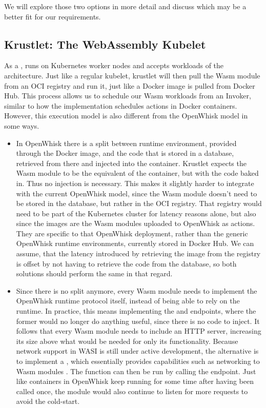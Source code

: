 We will explore those two options in more detail and discuss which may be a better fit for our requirements.

\subsection{Krustlet: The WebAssembly Kubelet}

As a ,  runs on Kubernetes worker nodes and accepts workloads of the  architecture. Just like a regular kubelet, krustlet will then pull the Wasm module from an OCI registry and run it, just like a Docker image is pulled from Docker Hub. This process allows us to schedule our Wasm workloads from an Invoker, similar to how the  implementation schedules actions in Docker containers. However, this execution model is also different from the OpenWhisk model in some ways.

\begin{itemize}
    \item In OpenWhisk there is a split between runtime environment, provided through the Docker image, and the code that is stored in a database, retrieved from there and injected into the container. Krustlet expects the Wasm module to be the equivalent of the container, but with the code baked in. Thus no injection is necessary. This makes it slightly harder to integrate with the current OpenWhisk model, since the Wasm module doesn't need to be stored in the database, but rather in the OCI registry. That registry would need to be part of the Kubernetes cluster for latency reasons alone, but also since the images are the Wasm modules uploaded to OpenWhisk as actions. They are specific to that OpenWhisk deployment, rather than the generic OpenWhisk runtime environments, currently stored in Docker Hub. We can assume, that the latency introduced by retrieving the image from the registry is offset by not having to retrieve the code from the database, so both solutions should perform the same in that regard.
    \item Since there is no split anymore, every Wasm module needs to implement the OpenWhisk runtime protocol itself, instead of being able to rely on the runtime. In practice, this means implementing the  and  endpoints, where the former would no longer do anything useful, since there is no code to inject. It follows that every Wasm module needs to include an HTTP server, increasing its size above what would be needed for only its functionality. Because network support in WASI is still under active development, the alternative is to implement a , which essentially provides capabilities such as networking to Wasm modules \cite{WC2021}. The function can then be run by calling the  endpoint. Just like containers in OpenWhisk keep running for some time after having been called once, the module would also continue to listen for more requests to avoid the cold-start.
\end{itemize}

